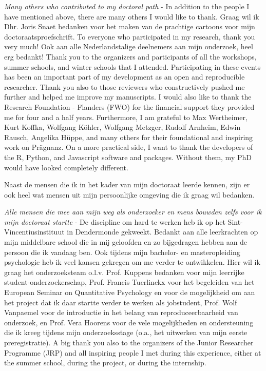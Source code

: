 \textit{Many others who contributed to my doctoral path} - In addition to the people I have mentioned above, there are many others I would like to thank. Graag wil ik Dhr. Joris Snaet bedanken voor het maken van de prachtige cartoons voor mijn doctoraatsproefschrift. To everyone who participated in my research, thank you very much! Ook aan alle Nederlandstalige deelnemers aan mijn onderzoek, heel erg bedankt! Thank you to the organizers and participants of all the workshops, summer schools, and winter schools that I attended. Participating in these events has been an important part of my development as an open and reproducible researcher. Thank you also to those reviewers who constructively pushed me further and helped me improve my manuscripts. I would also like to thank the Research Foundation - Flanders (FWO) for the financial support they provided me for four and a half years. Furthermore, I am grateful to Max Wertheimer, Kurt Koffka, Wolfgang Köhler, Wolfgang Metzger, Rudolf Arnheim, Edwin Rausch, Angelika Hüppe, and many others for their foundational and inspiring work on Prägnanz. On a more practical side, I want to thank the developers of the R, Python, and Javascript software and packages. Without them, my PhD would have looked completely different. 

Naast de mensen die ik in het kader van mijn doctoraat leerde kennen, zijn er ook heel wat mensen uit mijn persoonlijke omgeving die ik graag wil bedanken.

\textit{Alle mensen die mee aan mijn weg als onderzoeker en mens bouwden zelfs voor ik mijn doctoraat startte} - De discipline om hard te werken heb ik op het Sint-Vincentiusinstituut in Dendermonde gekweekt. Bedankt aan alle leerkrachten op mijn middelbare school die in mij geloofden en zo bijgedragen hebben aan de persoon die ik vandaag ben. Ook tijdens mijn bachelor- en masteropleiding psychologie heb ik veel kansen gekregen om me verder te ontwikkelen. Hier wil ik graag het onderzoeksteam o.l.v. Prof. Kuppens bedanken voor mijn leerrijke student-onderzoekerschap, Prof. Francis Tuerlinckx voor het begeleiden van het European Seminar on Quantitative Psychology en voor de mogelijkheid om aan het project dat ik daar startte verder te werken als jobstudent, Prof. Wolf Vanpaemel voor de introductie in het belang van reproduceerbaarheid van onderzoek, en Prof. Vera Hoorens voor de vele mogelijkheden en ondersteuning die ik kreeg tijdens mijn onderzoeksstage (o.a., het uitwerken van mijn eerste preregistratie). A big thank you also to the organizers of the Junior Researcher Programme (JRP) and all inspiring people I met during this experience, either at the summer school, during the project, or during the internship. 

